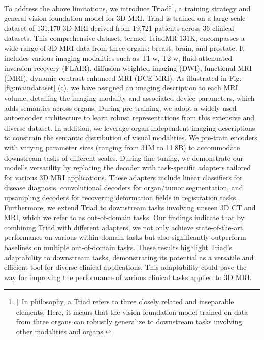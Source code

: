 To address the above limitations, we introduce Triad${^\ddagger}$\footnote[0]{${\ddagger}$ In philosophy, a Triad refers to three closely related and inseparable elements. Here, it means that the vision foundation model trained on data from three organs can robustly generalize to downstream tasks involving other modalities and organs.}, a training strategy and general vision foundation model for 3D MRI. Triad is  trained on a large-scale dataset of 131,170 3D MRI derived from 19,721 patients across 36 clinical datasets. This comprehensive dataset, termed TriadMR-131K, encompasses a wide range of 3D MRI data from three organs: breast, brain, and prostate. It includes various imaging modalities such as  T1-w, T2-w, fluid-attenuated inversion recovery (FLAIR), diffusion-weighted imaging (DWI), functional MRI (fMRI), dynamic contrast-enhanced MRI (DCE-MRI).
As illustrated in Fig. \ref{fig:maindataset} (c), we have assigned an imaging description to each MRI volume, detailing the imaging modality and associated device parameters, which adds semantics across organs.
During pre-training, we adopt a widely used autoencoder architecture to learn robust representations from this extensive and diverse dataset. In addition, we leverage organ-independent imaging descriptions to constrain the semantic distribution of visual modalities. We pre-train encoders with varying parameter sizes (ranging from 31M to 11.8B) to accommodate downstream tasks of different scales.
During fine-tuning, we demonstrate our model's versatility by replacing the decoder with task-specific adapters tailored for various 3D MRI applications. These adapters include linear classifiers for disease diagnosis, convolutional decoders for organ/tumor segmentation, and upsampling decoders for recovering deformation fields in registration tasks.
Furthermore, we extend Triad to downstream tasks involving unseen 3D CT and MRI, which we refer to as out-of-domain tasks. Our findings indicate that by combining Triad with different adapters, we not only achieve state-of-the-art performance on various within-domain tasks but also significantly outperform baselines on multiple out-of-domain tasks.
These results highlight Triad's adaptability to downstream tasks, demonstrating its potential as a versatile and efficient tool for diverse clinical applications. This adaptability could pave the way for improving the performance of various clinical tasks applied to 3D MRI.
